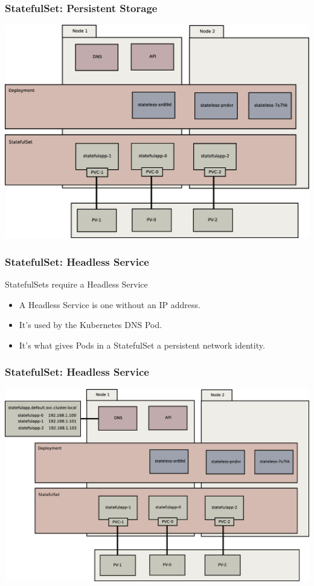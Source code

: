 \documentclass{beamer}
\begin{document}
\begin{frame}
    \frametitle{StatefulSet: Persistent Storage}
    \includegraphics[width=\textwidth,height=0.85\textheight,keepaspectratio]{graphics/06-persistence.eps}
\end{frame}

\begin{frame}
    \frametitle{StatefulSet: Headless Service}
    StatefulSets require a Headless Service
    \begin{itemize}
        \item A Headless Service is one without an IP address.
        \item It's used by the Kubernetes DNS Pod.
        \item It's what gives Pods in a StatefulSet a persistent network identity.
    \end{itemize}
\end{frame}

\begin{frame}
    \frametitle{StatefulSet: Headless Service}
    \includegraphics[width=\textwidth,height=0.85\textheight,keepaspectratio]{graphics/07-persistentIdentity.eps}
\end{frame}
\end{document}
